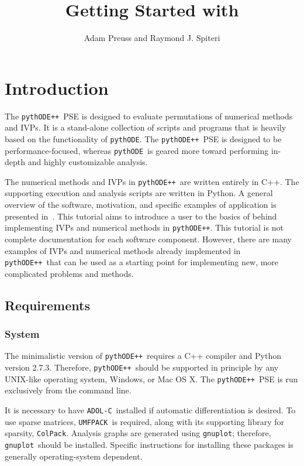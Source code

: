 \documentclass[11pt]{article}
\title{Getting Started with \pypp}
\author{Adam Preuss and Raymond J. Spiteri}
\newcommand{\pythode}{\texttt{pythODE}}
\newcommand{\pypp}{\texttt{pythODE++}}
\newcommand{\adolc}{\texttt{ADOL-C}}
\newcommand{\umfpack}{\texttt{UMFPACK}}
\newcommand{\colpack}{\texttt{ColPack}}
\newcommand{\gnuplot}{\texttt{gnuplot}}
\begin{document}
\maketitle

\section{Introduction}
\label{sec:intro}

The \pypp\ \ac{PSE} is designed to evaluate permutations of numerical
methods and \acp{IVP}.  It is a stand-alone collection of scripts and
programs that is heavily based on the functionality of \pythode.  The
\pypp\ PSE is designed to be performance-focused, whereas \pythode\ is
geared more toward performing in-depth and highly customizable
analysis.

The numerical methods and \acp{IVP} in \pypp\ are written entirely in
C++.  The supporting execution and analysis scripts are written in
Python. A general overview of the software, motivation, and specific
examples of application is presented in~\cite{preuss14}.  This
tutorial aims to introduce a user to the basics of behind implementing
\acp{IVP} and numerical methods in \pypp.  This tutorial is not
complete documentation for each software component.  However, there
are many examples of \acp{IVP} and numerical methods already
implemented in \pypp\ that can be used as a starting point for
implementing new, more complicated problems and methods.

\subsection{Requirements}

\subsubsection{System}

The minimalistic version of \pypp\ requires a C++ compiler and Python
version 2.7.3. Therefore, \pypp\ should be supported in principle by
any UNIX-like operating system, Windows, or Mac OS X. The \pypp\ PSE
is run exclusively from the command line.

It is necessary to have \adolc\ installed if automatic differentiation
is desired. To use sparse matrices, \umfpack\ is required, along with
its supporting library for sparsity, \colpack. Analysis graphs are
generated using \gnuplot; therefore, \gnuplot\ should be
installed. Specific instructions for installing these packages is
generally operating-system dependent.
\end{document}
